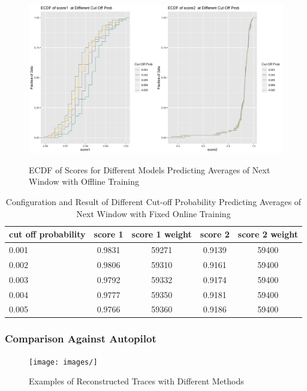 \documentclass{article}
\begin{document}
\begin{figure}
    \caption{ECDF of Scores for Different Models Predicting Averages of Next Window with Offline Training}
    \centering
    \includegraphics{images/ECDFofscoresatDifferentCutOffProbOfARI11,fixed.png}
    \label{fig:fig1.10.3}
\end{figure}

\begin{table}[htbp]
  \begin{center}
    \caption{Configuration and Result of Different Cut-off Probability Predicting Averages of Next Window with Fixed Online Training}
    \label{tab:tab1.10.3}
    \begin{tabular}{l|*{4}{c}}
      \textbf{cut off probability} & \textbf{score 1} & \textbf{score 1 weight} & \textbf{score 2} & \textbf{score 2 weight} \\
      \hline
      0.001 & 0.9831 & 59271 & 0.9139 & 59400\\
      0.002 & 0.9806 & 59310 & 0.9161 & 59400\\
      0.003 & 0.9792 & 59332 & 0.9174 & 59400\\
      0.004 & 0.9777 & 59350 & 0.9181 & 59400\\
      0.005 & 0.9766 & 59360 & 0.9186 & 59400\\
    \end{tabular}
  \end{center}
\end{table}

\subsubsection{Comparison Against Autopilot}

\begin{figure}
    \caption{Examples of Reconstructed Traces with Different Methods}
    \centering
    \texttt{[image: images/]}
    \label{fig:fig1.11.1}
\end{figure}
\end{document}
